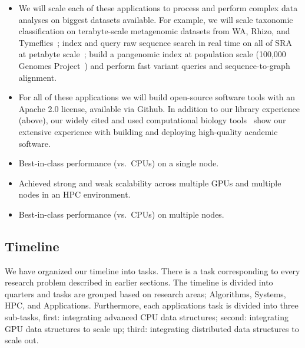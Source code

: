 \begin{itemize}[leftmargin=*,noitemsep]
  \item We will scale each of these applications to process and perform complex data analyses on biggest datasets available. For example, we will scale taxonomic classification on terabyte-scale metagenomic datasets from WA, Rhizo, and Tymeflies~\cite{hofmeyr2020terabase}; index and query raw sequence search in real time on all of SRA at petabyte scale~\cite{kodama2012sequence}; build a pangenomic index at population scale (100,000 Genomes Project~\cite{1002021100}) and perform fast variant queries and sequence-to-graph alignment.
  \item For all of these applications we will build open-source software tools with an Apache 2.0 license, available via Github. In addition to our library experience (above), our widely cited and used computational biology tools~\cite{PandeyABFJP18Cell,PandeyBJP17a,PandeyBJP17b,PandeyBJP17,pandey2020timely,pandey2021variantstore,pandey2021terrace,pandey2022iceberght} show our extensive experience with building and deploying high-quality academic software.
  \item Best-in-class performance (vs.\ CPUs) on a single node.
  \item Achieved strong and weak scalability across multiple GPUs and multiple nodes in an HPC environment.
  \item Best-in-class performance (vs.\ CPUs) on multiple nodes.
\end{itemize}


\subsection{Timeline}

We have organized our timeline into tasks. There is a task corresponding to every research problem described in earlier sections. The timeline is divided into quarters and tasks are grouped based on research areas; Algorithms, Systems, HPC, and Applications. Furthermore, each applications task is divided into three sub-tasks, first: integrating advanced CPU data structures; second: integrating GPU data structures to scale up; third: integrating distributed data structures to scale out.




